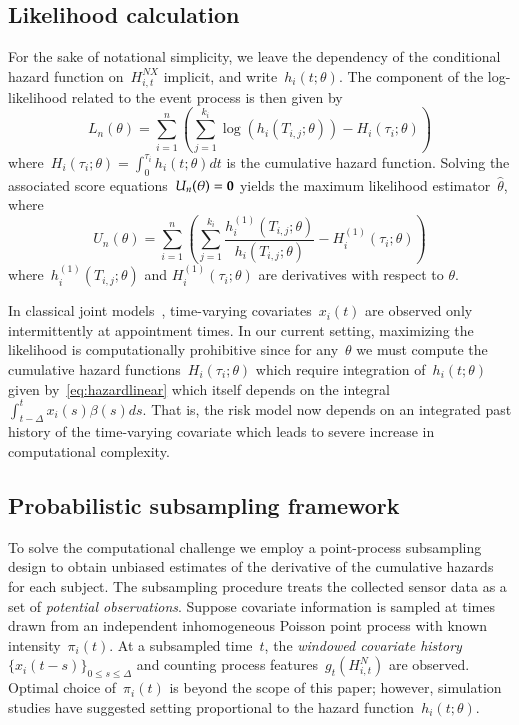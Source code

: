 \documentclass[11pt]{amsart}
\begin{document}
\subsection{Likelihood calculation}

For the sake of notational simplicity, we leave the dependency of the conditional hazard function on~$H_{i,t}^{NX}$ implicit, and write~$h_i (t; \theta)$. The component of the log-likelihood related to the event process is then given by
\[
  L_n (\theta) = \sum_{i=1}^{n} \left ( \sum_{j=1}^{k_i}
    \log \left( h_i \left( T_{i,j}; \theta
      \right) \right) - H_{i} \left( \tau_i; \theta \right) \right)
\]
where~$H_{i} (\tau_i ; \theta) = \int_{0}^{\tau_i} h_{i} (t; \theta) dt$ is the cumulative hazard function. Solving the associated score equations~$U_n (\theta) = {\bf 0}$ yields the maximum likelihood estimator~$\hat \theta$, where
\[
U_n (\theta) = \sum_{i=1}^{n} \left ( \sum_{j=1}^{k_i} \frac{h^{(1)}_i
    (T_{i,j}; \theta)}{h_i (T_{i,j}; \theta)} - H^{(1)}_{i} (\tau_i;
  \theta) \right)
\]
where~$h_i^{(1)} (T_{i,j}; \theta)$ and $H_i^{(1)} (\tau_{i}; \theta)$ are derivatives with respect to $\theta$.

In classical joint models~\citep{Henderson2000, Tsiatis2004}, time-varying covariates~$x_i (t)$ are observed only intermittently at appointment times. In our current setting, maximizing the likelihood is computationally prohibitive since for any~$\theta$ we must compute the cumulative hazard functions~$H_{i} (\tau_i; \theta)$ which require integration of~$h_i(t;\theta)$ given by~\eqref{eq:hazardlinear} which itself depends on the integral~$\int_{t-\Delta}^t x_i (s) \beta(s) ds$.  That is, the risk model now depends on an integrated past history of the time-varying covariate which leads to severe increase in computational complexity.

\subsection{Probabilistic subsampling framework}

To solve the computational challenge we employ a point-process subsampling design to obtain unbiased estimates of the derivative of the cumulative hazards for each subject. The subsampling procedure treats the collected sensor data as a set of \emph{potential observations}. Suppose covariate information is sampled at times drawn from an independent inhomogeneous Poisson point process with known intensity~$\pi_i (t)$. At a subsampled time~$t$, the \emph{windowed covariate history} $\{ x_i (t-s)\}_{0 \leq s \leq \Delta}$ and counting process features~$g_t (H_{i,t}^N)$ are observed. Optimal choice of~$\pi_i (t)$ is beyond the scope of this paper; however, simulation studies have suggested setting proportional to the hazard function~$h_i (t; \theta)$.
\end{document}
